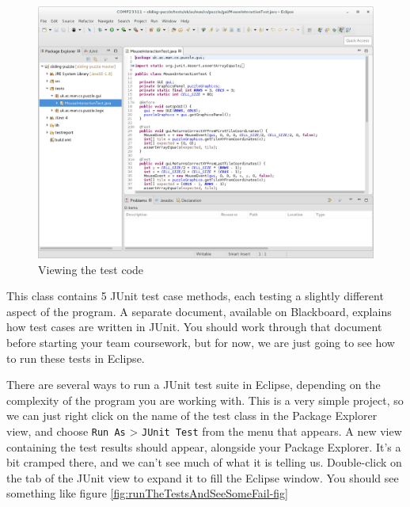 \documentclass[
]{book}
\begin{document}
\begin{figure}

{\centering \includegraphics[width=1\linewidth]{images/viewingtheTestCode} 

}

\caption{Viewing the test code}\label{fig:viewingtheTestCode-fig}
\end{figure}

This class contains 5 JUnit test case methods, each testing a slightly different aspect of the program. A separate document, available on Blackboard, explains how test cases are written in JUnit. You should work through that document before starting your team coursework, but for now, we are just going to see how to run these tests in Eclipse.

There are several ways to run a JUnit test suite in Eclipse, depending on the complexity of the program you are working with. This is a very simple project, so we can just right click on the name of the test class in the Package Explorer view, and choose \texttt{Run\ As} \textgreater{} \texttt{JUnit\ Test} from the menu that appears. A new view containing the test results should appear, alongside your Package Explorer. It's a bit cramped there, and we can't see much of what it is telling us. Double-click on the tab of the JUnit view to expand it to fill the Eclipse window. You should see something like figure \ref{fig:runTheTestsAndSeeSomeFail-fig}
\end{document}
